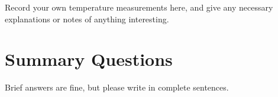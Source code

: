 \noindent Record your own temperature measurements here, and give any necessary explanations or notes of anything interesting.



%
%
%
%
%
%
%
%
%

\newpage
\section{Summary Questions}

Brief answers are fine, but please write in complete sentences.

